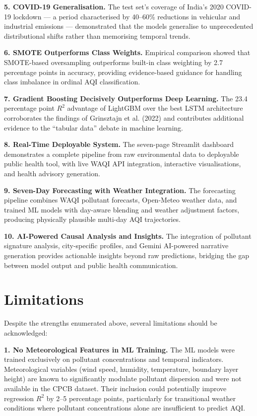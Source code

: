 \documentclass[12pt,a4paper]{report}
\begin{document}
\textbf{5. COVID-19 Generalisation.} The test set's coverage of India's 2020 COVID-19 lockdown --- a period characterised by 40--60\% reductions in vehicular and industrial emissions --- demonstrated that the models generalise to unprecedented distributional shifts rather than memorising temporal trends.

\textbf{6. SMOTE Outperforms Class Weights.} Empirical comparison showed that SMOTE-based oversampling outperforms built-in class weighting by 2.7 percentage points in accuracy, providing evidence-based guidance for handling class imbalance in ordinal AQI classification.

\textbf{7. Gradient Boosting Decisively Outperforms Deep Learning.} The 23.4 percentage point $R^2$ advantage of LightGBM over the best LSTM architecture corroborates the findings of Grinsztajn et al. (2022) and contributes additional evidence to the ``tabular data'' debate in machine learning.

\textbf{8. Real-Time Deployable System.} The seven-page Streamlit dashboard demonstrates a complete pipeline from raw environmental data to deployable public health tool, with live WAQI API integration, interactive visualisations, and health advisory generation.

\textbf{9. Seven-Day Forecasting with Weather Integration.} The forecasting pipeline combines WAQI pollutant forecasts, Open-Meteo weather data, and trained ML models with day-aware blending and weather adjustment factors, producing physically plausible multi-day AQI trajectories.

\textbf{10. AI-Powered Causal Analysis and Insights.} The integration of pollutant signature analysis, city-specific profiles, and Gemini AI-powered narrative generation provides actionable insights beyond raw predictions, bridging the gap between model output and public health communication.

\section{Limitations}\label{idx:s82}

Despite the strengths enumerated above, several limitations should be acknowledged:

\textbf{1. No Meteorological Features in ML Training.} The ML models were trained exclusively on pollutant concentrations and temporal indicators. Meteorological variables (wind speed, humidity, temperature, boundary layer height) are known to significantly modulate pollutant dispersion and were not available in the CPCB dataset. Their inclusion could potentially improve regression $R^2$ by 2--5 percentage points, particularly for transitional weather conditions where pollutant concentrations alone are insufficient to predict AQI.
\end{document}
